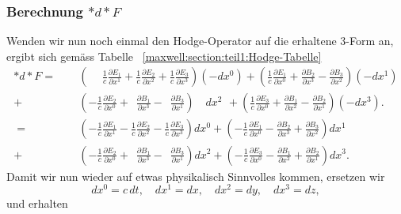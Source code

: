 \subsubsection{Berechnung $\ast d {\ast} F$}
Wenden wir nun noch einmal den Hodge-Operator auf die erhaltene 3-Form an, ergibt sich gemäss Tabelle ~\ref{maxwell:section:teil1:Hodge-Tabelle}
\begin{align*}
	\ast d {\ast} F 
	= 
	\phantom{+} &\left(\phantom{+} \frac{1}{c}\frac{\partial E_1}{\partial x^1} + \frac{1}{c}\frac{\partial E_2}{\partial x^2} + \frac{1}{c}\frac{\partial E_3}{\partial x^3} \right) (-dx^0) +
	\left(\frac{1}{c}\frac{\partial E_1}{\partial x^0} + \frac{\partial B_2}{\partial x^3} - \frac{\partial B_3}{\partial x^2} \right) (-dx^1)
	\\
	+ &\left( -\frac{1}{c}\frac{\partial E_2}{\partial x^0} + \phantom{\frac{1}{c}} \frac{\partial B_1}{\partial x^3} - \phantom{\frac{1}{c}} \frac{\partial B_3}{\partial x^1} \right) \quad dx^2 \: \, +
	\left( \frac{1}{c}\frac{\partial E_3}{\partial x^0} + \frac{\partial B_1}{\partial x^2} - \frac{\partial B_2}{\partial x^1} \right) (-dx^3).\\[2ex]
	=
	\phantom{+} &\left( -\frac{1}{c}\frac{\partial E_1}{\partial x^1} -\frac{1}{c}\frac{\partial E_2}{\partial x^2} - \frac{1}{c}\frac{\partial E_3}{\partial x^3} \right) dx^0 +
	\left(-\frac{1}{c}\frac{\partial E_1}{\partial x^0} - \frac{\partial B_2}{\partial x^3} + \frac{\partial B_3}{\partial x^2} \right) dx^1
	\\
	+ &\left( -\frac{1}{c}\frac{\partial E_2}{\partial x^0} + \phantom{\frac{1}{c}} \frac{\partial B_1}{\partial x^3} - \phantom{\frac{1}{c}} \frac{\partial B_3}{\partial x^1} \right) dx^2 +
	\left( -\frac{1}{c}\frac{\partial E_3}{\partial x^0} - \frac{\partial B_1}{\partial x^2} + \frac{\partial B_2}{\partial x^1} \right) dx^3.
\end{align*}
Damit wir nun wieder auf etwas physikalisch Sinnvolles kommen, ersetzen wir
\begin{equation}
	dx^0 = c\,dt, \quad dx^1 = dx, \quad dx^2 = dy, \quad dx^3 = dz,
\end{equation}
und erhalten
